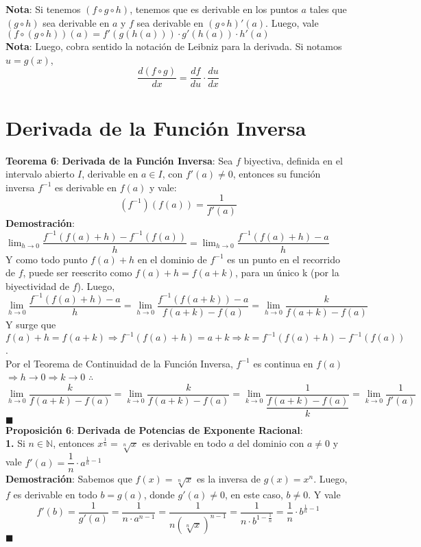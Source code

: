 \documentclass[11pt,a4paper]{article}
\newcommand*{\QEDA}{\null\nobreak\hfill\ensuremath{\blacksquare}}
\begin{document}
\textbf{Nota}: Si tenemos $(f \circ g \circ h)$, tenemos que es derivable en los puntos $a$ tales que $(g \circ h)$ sea derivable en $a$ y $f$ sea derivable en $(g \circ h)'(a)$. Luego, vale $(f \circ (g \circ h))(a) = f'(g(h(a))) \cdot g'(h(a)) \cdot h'(a)$\\

\textbf{Nota}: Luego, cobra sentido la notaci\'on de Leibniz para la derivada. Si notamos $u = g(x)$, $$\dfrac{d(f \circ g)}{dx} = \dfrac{df}{du} \cdot \dfrac{du}{dx}$$

\section{Derivada de la Funci\'on Inversa}
\textbf{Teorema 6}: \textbf{Derivada de la Funci\'on Inversa}: Sea $f$ biyectiva, definida en el intervalo abierto $I$, derivable en $a \in I$, con $f'(a)\not=0$, entonces su funci\'on inversa $f^{-1}$ es derivable en $f(a)$ y vale: $$(f^{-1})(f(a)) = \dfrac{1}{f'(a)}$$
\textbf{Demostraci\'on}: 
$\displaystyle{\lim_{h \to 0} \dfrac{f^{-1}(f(a)+h) - f^{-1}(f(a))}{h}}
= \displaystyle{\lim_{h \to 0} \dfrac{f^{-1}(f(a)+h) - a}{h}}$\\
Y como todo punto $f(a)+h$ en el dominio de $f^{-1}$ es un punto en el recorrido de $f$, puede ser reescrito como $f(a)+h = f(a+k)$, para un \'unico k (por la biyectividad de $f$). Luego, \\
$$\displaystyle{\lim_{h \to 0} \dfrac{f^{-1}(f(a)+h) - a}{h}} =
 \displaystyle{\lim_{h \to 0} \dfrac{f^{-1}(f(a+k)) - a}{f(a+k)-f(a)}} =
 \displaystyle{\lim_{h \to 0} \dfrac{k}{f(a+k)-f(a)}}$$
Y surge que $f(a)+h = f(a+k) \Rightarrow f^{-1}(f(a)+h)=a+k \Rightarrow k = f^{-1}(f(a)+h) - f^{-1}(f(a))$. \\
Por el Teorema de Continuidad de la Funci\'on Inversa, $f^{-1}$ es continua en $f(a)$ $\Rightarrow h \rightarrow 0 \Rightarrow k \rightarrow 0$ $\therefore$
$$\displaystyle{\lim_{h \to 0} \dfrac{k}{f(a+k)-f(a)}} = \displaystyle{\lim_{k \to 0} \dfrac{k}{f(a+k)-f(a)}} = \displaystyle{\lim_{k \to 0} \dfrac{1}{\dfrac{f(a+k)-f(a)}{k}}} = \displaystyle{\lim_{k \to 0} \dfrac{1}{f'(a)}}$$ \QEDA\\

\noindent \textbf{Proposici\'on 6}: \textbf{Derivada de Potencias de Exponente Racional}:\\
\textbf{1.} Si $n \in \mathbb{N}$, entonces $x^{\frac{1}{n}} = \sqrt[n]{x}$ es derivable en todo $a$ del dominio con $a\not=0$ y vale $f'(a) = \dfrac{1}{n} \cdot a^{\frac{1}{n}-1}$\\
\textbf{Demostraci\'on}: Sabemos que $f(x)=\sqrt[n]{x}$ es la inversa de $g(x)=x^n$. Luego, $f$ es derivable en todo $b = g(a)$, donde $g'(a)\not=0$, en este caso, $b\not=0$. Y vale $$f'(b)=\dfrac{1}{g'(a)} = \dfrac{1}{n\cdot a^{n-1}} = \dfrac{1}{n(\sqrt[n]{x})^{n-1}} = \dfrac{1}{n\cdot b^{1-\frac{1}{n}}} = \dfrac{1}{n}\cdot b^{\frac{1}{n}-1}$$ \QEDA
\end{document}
